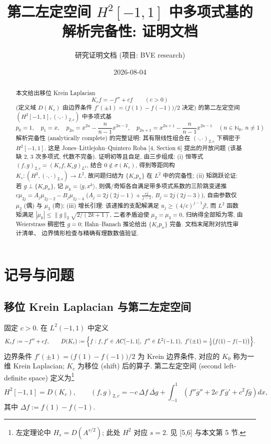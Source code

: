 \documentclass[UTF8]{ctexart}
\title{第二左定空间 \texorpdfstring{$H^2[-1,1]$}{H2} 中多项式基的解析完备性: 证明文档}
\author{研究证明文档 (项目: BVE research)}
\date{2026-08-04}
\begin{document}
\maketitle

\begin{abstract}
本文给出移位 Krein Laplacian
\[
	K_c f = -f'' + c f \qquad (c > 0)
\]
(定义域 $D(K_c)$ 由边界条件 $f'(\pm 1) = \bigl(f(1)-f(-1)\bigr)/2$ 决定)
的第二左定空间 $(H^2[-1,1], (\cdot, \cdot)_{2,c})$ 中多项式基
\[
	p_0 = 1, \quad p_1 = x, \quad
	p_{2n} = x^{2n} - \frac{n}{n-1} x^{2n-2}, \quad
	p_{2n+1} = x^{2n+1} - \frac{n}{n-1} x^{2n-1}
	\quad (n \in \mathbb{N}_0,\ n \neq 1)
\]
解析完备性 (analytically complete) 的完整证明: 其有限线性组合在
$(\cdot, \cdot)_{2,c}$ 下稠密于 $H^2[-1,1]$. 这是 Jones--Littlejohn--Quintero Roba
[4, Section 6] 提出的开放问题 (该基缺 2, 3 次多项式, 代数不完备).
证明初等且自足, 由三步组成:
(i) 恒等式 $(f,g)_{2,c} = (K_c f, K_c g)_{L^2}$, 结合 $0 \notin \sigma(K_c)$,
得到等距同构 $K_c: (H^2, (\cdot,\cdot)_{2,c}) \to L^2$, 故问题归结为
$\{K_c p_n\}$ 在 $L^2$ 中的完备性;
(ii) 矩跳跃论证: 若 $g \perp \{K_c p_n\}$, 记 $\mu_k = \langle g, x^k \rangle$,
则偶/奇矩各自满足带多项式系数的三阶跳变递推
$c\mu_{2j} = A_j \mu_{2j-2} - B_j \mu_{2j-4}$ ($A_j = 2j(2j-1) + \tfrac{cj}{j-1}$,
$B_j = 2j(2j-3)$), 自由参数仅 $\mu_2$ (偶) 与 $\mu_3$ (奇);
(iii) 增长引理: 该递推的支配解满足 $u_j \geq (4/c)^{j-1} j!$, 而
$L^2$ 函数矩满足 $|\mu_k| \leq \|g\|_2 \sqrt{2/(2k+1)}$, 二者矛盾迫使
$\mu_2 = \mu_3 = 0$, 归纳得全部矩为零, 由 Weierstrass 稠密性 $g = 0$;
Hahn--Banach 推论给出 $\{K_c p_n\}$ 完备. 文档末尾附对抗性审计清单、
边界情形检查与精确有理数数值验证.
\end{abstract}

\tableofcontents

\section{记号与问题}

\subsection{移位 Krein Laplacian 与第二左定空间}

固定 $c > 0$. 在 $L^2(-1,1)$ 中定义
\begin{equation}
	K_c f := -f'' + c f, \qquad
	D(K_c) := \Bigl\{ f : f, f' \in AC[-1,1],\ f'' \in L^2(-1,1),\
		f'(\pm 1) = \tfrac{1}{2}\bigl( f(1) - f(-1) \bigr) \Bigr\}.
\end{equation}
边界条件 $f'(\pm 1) = \bigl(f(1)-f(-1)\bigr)/2$ 为 Krein 边界条件, 对应的
$K_0$ 称为一维 Krein Laplacian; $K_c$ 为移位 (shift) 后的算子. 第二左定空间
(second left-definite space) 定义为\footnote{左定理论中 $H_s = D(A^{s/2})$; 此处 $H^2$ 对应 $s = 2$. 见 [5,6] 与本文第 5 节.}
\begin{equation}
	H^2[-1,1] = D(K_c),
	\qquad
	(f, g)_{2,c} = -c\, \Delta f\, \overline{\Delta g}
		+ \int_{-1}^{1} \left( f''\overline{g}'' + 2c\, f'\overline{g}' + c^2 f\overline{g} \right) dx,
\end{equation}
其中 $\Delta f := f(1) - f(-1)$.
\end{document}
